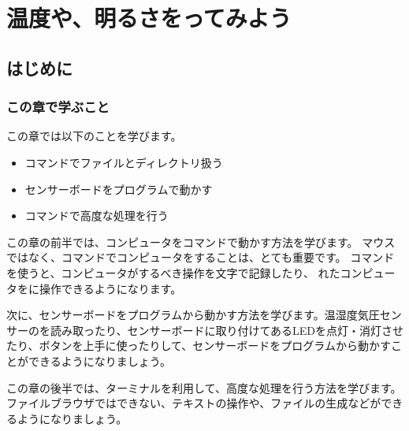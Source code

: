 \chapter{温度や、明るさをってみよう}
\section{はじめに}
\subsection{この章で学ぶこと}
この章では以下のことを学びます。
\begin{itemize}
    \item コマンドでファイルとディレクトリ扱う
    \item センサーボードをプログラムで動かす
    \item コマンドで高度な処理を行う
\end{itemize}

この章の前半では、コンピュータをコマンドで動かす方法を学びます。
マウスではなく、コマンドでコンピュータをすることは、とても重要です。
コマンドを使うと、コンピュータがするべき操作を文字で記録したり、
れたコンピュータをに操作できるようになります。

次に、センサーボードをプログラムから動かす方法を学びます。温湿度気圧センサーのを読み取ったり、センサーボードに取り付けてあるLEDを点灯・消灯させたり、ボタンを上手に使ったりして、センサーボードをプログラムから動かすことができるようになりましょう。

この章の後半では、ターミナルを利用して、高度な処理を行う方法を学びます。
ファイルブラウザではできない、テキストの操作や、ファイルの生成などができるようになりましょう。

